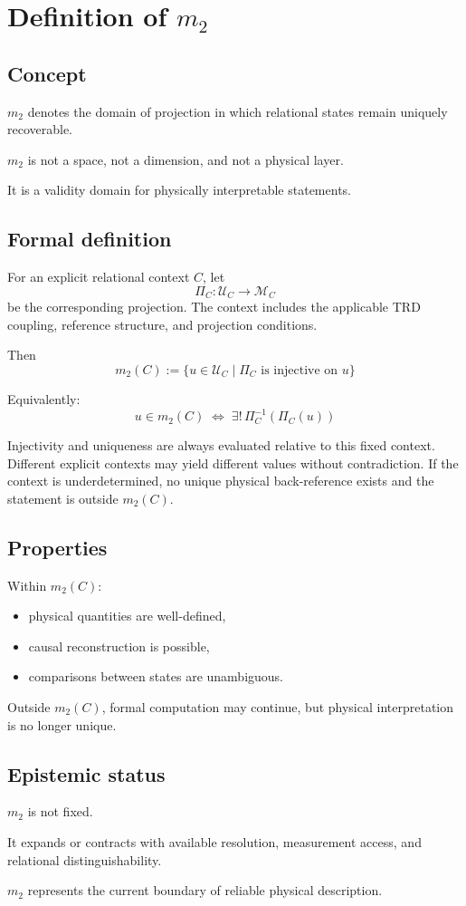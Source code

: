 \section{Definition of $m_2$}

\subsection{Concept}

$m_2$ denotes the domain of projection
in which relational states remain uniquely recoverable.

$m_2$ is not a space,
not a dimension,
and not a physical layer.

It is a validity domain
for physically interpretable statements.

\subsection{Formal definition}

For an explicit relational context $C$, let
\[
\Pi_C : \mathcal{U}_C \rightarrow \mathcal{M}_C
\]
be the corresponding projection. The context includes the applicable
TRD coupling, reference structure, and projection conditions.

Then
\[
m_2(C) := \{ u \in \mathcal{U}_C \mid \Pi_C \text{ is injective on } u \}
\]

Equivalently:
\[
u \in m_2(C)
\;\Longleftrightarrow\;
\exists!\,\Pi_C^{-1}(\Pi_C(u))
\]

Injectivity and uniqueness are always evaluated relative to this fixed context.
Different explicit contexts may yield different values without contradiction.
If the context is underdetermined, no unique physical back-reference exists
and the statement is outside $m_2(C)$.

\subsection{Properties}

Within $m_2(C)$:
\begin{itemize}
    \item physical quantities are well-defined,
    \item causal reconstruction is possible,
    \item comparisons between states are unambiguous.
\end{itemize}

Outside $m_2(C)$,
formal computation may continue,
but physical interpretation is no longer unique.

\subsection{Epistemic status}

$m_2$ is not fixed.

It expands or contracts
with available resolution,
measurement access,
and relational distinguishability.

$m_2$ represents
the current boundary
of reliable physical description.
